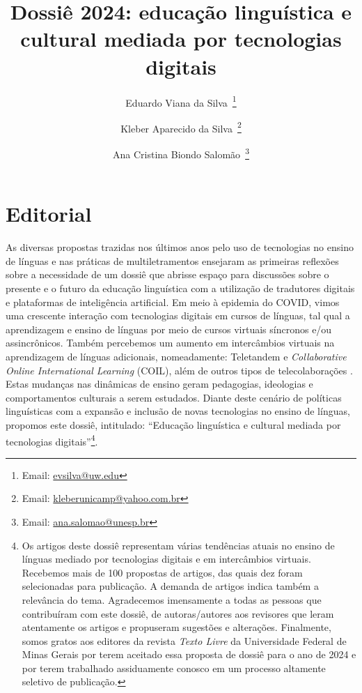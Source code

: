 \documentclass[portuguese]{textolivre}
\title{Dossiê 2024: educação linguística e cultural mediada por tecnologias digitais}
\author[1]{Eduardo Viana da Silva~\orcid{0000-0002-3651-3524}\thanks{Email: \href{mailto:evsilva@uw.edu}{evsilva@uw.edu}}}
\author[2]{Kleber Aparecido da Silva~\orcid{0000-0002-7815-7767}\thanks{Email: \href{mailto:kleberunicamp@yahoo.com.br}{kleberunicamp@yahoo.com.br}}}
\author[3]{Ana Cristina Biondo Salomão~\orcid{0000-0002-1531-8551}\thanks{Email: \href{mailto:ana.salomao@unesp.br}{ana.salomao@unesp.br}}}
\affil[1]{University of Washington, EUA.}
\affil[2]{Universidade de Brasília, Brasília, DF, Brasil.}
\affil[3]{Universidade Estadual Paulista "Júlio de Mesquita Filho, Araquara, SP, Brasil.}
\begin{document}
\maketitle

\section{Editorial}
As diversas propostas trazidas nos últimos anos pelo uso de tecnologias no ensino de línguas e nas práticas de multiletramentos ensejaram as primeiras reflexões sobre a necessidade de um dossiê que abrisse espaço para discussões sobre o presente e o futuro da educação linguística com a utilização de tradutores digitais e plataformas de inteligência artificial. Em meio à epidemia do COVID, vimos uma crescente interação com tecnologias digitais em cursos de línguas, tal qual a aprendizagem e ensino de línguas por meio de cursos virtuais síncronos e/ou assincrônicos. Também percebemos um aumento em intercâmbios virtuais na aprendizagem de línguas adicionais, nomeadamente: Teletandem e \textit{Collaborative Online International Learning} (COIL), além de outros tipos de telecolaborações \cite{salomao2020,salomao2023}. Estas mudanças nas dinâmicas de ensino geram pedagogias, ideologias e comportamentos culturais a serem estudados. Diante deste cenário de políticas linguísticas com a expansão e inclusão de novas tecnologias no ensino de línguas, propomos este dossiê, intitulado: “Educação linguística e cultural mediada por tecnologias digitais”\footnote{Os artigos deste dossiê representam várias tendências atuais no ensino de línguas mediado por tecnologias digitais e em intercâmbios virtuais. Recebemos mais de 100 propostas de artigos, das quais dez foram selecionadas para publicação. A demanda de artigos indica também a relevância do tema. Agradecemos imensamente a todas as pessoas que contribuíram com este dossiê, de autoras/autores aos revisores que leram atentamente os artigos e propuseram sugestões e alterações. Finalmente, somos gratos aos editores da revista \textit{Texto Livre} da Universidade Federal de Minas Gerais por terem aceitado essa proposta de dossiê para o ano de 2024 e por terem trabalhado assiduamente conosco em um processo altamente seletivo de publicação.}.
\end{document}
